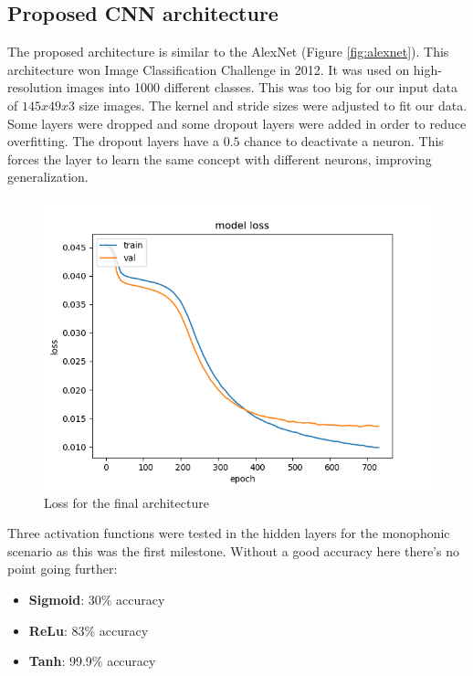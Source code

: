 \subsection{Proposed CNN architecture}
The proposed architecture is similar to the AlexNet \cite{alexnet} (Figure \ref{fig:alexnet}). This architecture won Image Classification Challenge in 2012. It was used on high-resolution images into 1000 different classes. This was too big for our input data of $145x49x3$ size images. The kernel and stride sizes were adjusted to fit our data. Some layers were dropped and some dropout layers were added in order to reduce overfitting. The dropout layers have a $0.5$ chance to deactivate a neuron. This forces the layer to learn the same concept with different neurons, improving generalization.
\par

\begin{figure}[h!]
	\caption[Loss progression over the epochs]{ Loss for the final architecture}
	\centering
	\label{fig:loss}
	\includegraphics[width=1\textwidth, height=\textheight, keepaspectratio]{"resources/loss"}
\end{figure}


Three activation functions were tested in the hidden layers for the monophonic scenario as this was the first milestone. Without a good accuracy here there's no point going further:
\begin{itemize}
	\item \textbf{Sigmoid}: 30\% accuracy
	\item \textbf{ReLu}: 83\% accuracy
	\item \textbf{Tanh}: 99.9\% accuracy
\end{itemize}

